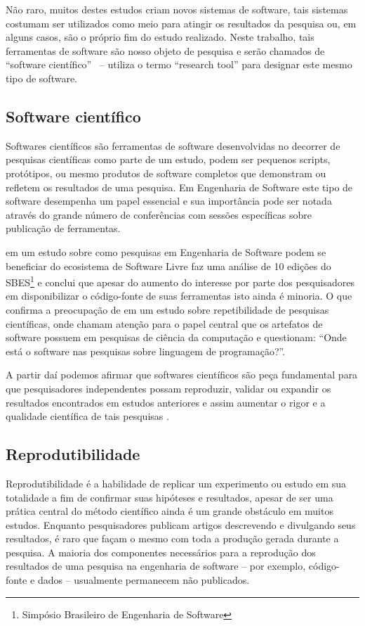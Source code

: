 \documentclass[qual, classic, a4paper]{ufbathesis}
\begin{document}
Não raro, muitos destes estudos criam novos sistemas de software, tais
sistemas costumam ser utilizados como meio para atingir os resultados da
pesquisa ou, em alguns casos, são o próprio fim do estudo realizado. Neste
trabalho, tais ferramentas de software são nosso objeto de pesquisa e serão
chamados de ``software científico'' \ --  utiliza o termo
``research tool'' para designar este mesmo tipo de software.

\subsection{Software científico}

Softwares científicos são ferramentas de software desenvolvidas no decorrer de
pesquisas científicas como parte de um estudo, podem ser pequenos scripts,
protótipos, ou mesmo produtos de software completos que demonstram ou refletem
os resultados de uma pesquisa. Em Engenharia de Software este tipo de software
desempenha um papel essencial e sua importância pode ser notada através do
grande número de conferências com sessões específicas sobre publicação de
ferramentas.

 em um estudo sobre como pesquisas em Engenharia de
Software podem se beneficiar do ecosistema de Software Livre faz uma análise
de 10 edições do SBES\footnote{Simpósio Brasileiro de Engenharia de Software}
e conclui que apesar do aumento do interesse por parte dos pesquisadores em
disponibilizar o código-fonte de suas ferramentas isto ainda é minoria. O
que confirma a preocupação de  em um estudo
sobre repetibilidade de pesquisas científicas, onde chamam atenção para o papel
central que os artefatos de software possuem em pesquisas de ciência da
computação e questionam: ``Onde está o software nas pesquisas sobre linguagem
de programação?''.

A partir daí podemos afirmar que softwares científicos são peça fundamental
para que pesquisadores independentes possam reproduzir, validar ou expandir os
resultados encontrados em estudos anteriores e assim aumentar o rigor e a
qualidade científica de tais pesquisas \cite{Vitek2011}.

\subsection{Reprodutibilidade}

Reprodutibilidade é a habilidade de replicar um experimento ou estudo em sua
totalidade a fim de confirmar suas hipóteses e resultados, apesar de ser uma
prática central do método científico ainda é um grande obstáculo em muitos
estudos. Enquanto pesquisadores publicam artigos descrevendo e divulgando seus
resultados, é raro que façam o mesmo com toda a produção gerada durante a
pesquisa. A maioria dos componentes necessários para a reprodução dos
resultados de uma pesquisa na engenharia de software -- por exemplo,
código-fonte e dados -- usualmente permanecem não publicados.
\end{document}

